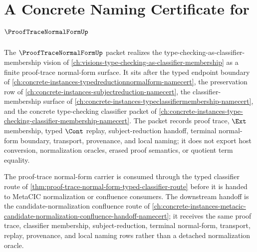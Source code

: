 \chapter{A Concrete Naming Certificate for $\ProofTraceNormalFormUp$}
\label{ch:concrete-instances-proof-trace-normal-form-namecert}

The $\ProofTraceNormalFormUp$ packet realizes the type-checking-as-classifier-membership vision of \autoref{ch:visions-type-checking-as-classifier-membership} as a finite proof-trace normal-form surface. It sits after the typed endpoint boundary of \autoref{ch:concrete-instances-typedreductionnormalform-namecert}, the preservation row of \autoref{ch:concrete-instances-subjectreduction-namecert}, the classifier-membership surface of \autoref{ch:concrete-instances-typeclassifiermembership-namecert}, and the concrete type-checking classifier packet of \autoref{ch:concrete-instances-type-checking-classifier-membership-namecert}. The packet records proof trace, $\Ext$ membership, typed $\Cont$ replay, subject-reduction handoff, terminal normal-form boundary, transport, provenance, and local naming; it does not export host conversion, normalization oracles, erased proof semantics, or quotient term equality.

The proof-trace normal-form carrier is consumed through the typed classifier route of \autoref{thm:proof-trace-normal-form-typed-classifier-route} before it is handed to MetaCIC normalization or confluence consumers. The downstream handoff is the candidate-normalization confluence route of \autoref{ch:concrete-instances-metacic-candidate-normalization-confluence-handoff-namecert}; it receives the same proof trace, classifier membership, subject-reduction, terminal normal-form, transport, replay, provenance, and local naming rows rather than a detached normalization oracle.

